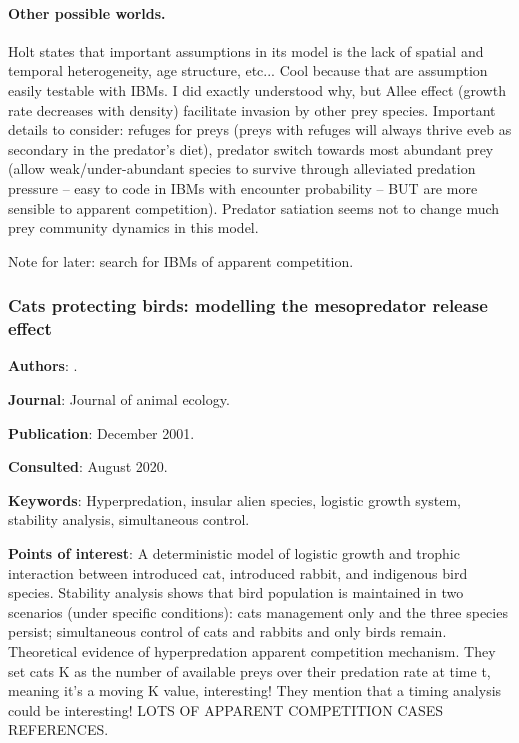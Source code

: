 \documentclass[12pt,a4paper]{article}
\begin{document}
\paragraph{Other possible worlds.} Holt states that important assumptions in its model is the lack of spatial and temporal heterogeneity, age structure, etc... Cool because that are assumption easily testable with IBMs. I did exactly understood why, but Allee effect (growth rate decreases with density) facilitate invasion by other prey species. Important details to consider: refuges for preys (preys with refuges will always thrive eveb as secondary in the predator's diet), predator switch towards most abundant prey (allow weak/under-abundant species to survive through alleviated predation pressure -- easy to code in IBMs with encounter probability -- BUT are more sensible to apparent competition). Predator satiation seems not to change much prey community dynamics in this model.
 
Note for later: search for IBMs of apparent competition.

\newpage

\subsubsection*{Cats protecting birds: modelling the mesopredator release effect}

\textbf{Authors}: \cite{courchamp1999cats}.

\textbf{Journal}: Journal of animal ecology.

\textbf{Publication}: December 2001.

\textbf{Consulted}: August 2020.

\textbf{Keywords}: Hyperpredation, insular alien species, logistic growth system, stability analysis, simultaneous control.

\textbf{Points of interest}: A deterministic model of logistic growth and trophic interaction between introduced cat, introduced rabbit, and indigenous bird species. Stability analysis shows that bird population is maintained in two scenarios (under specific conditions): cats management only and the three species persist; simultaneous control of cats and rabbits and only birds remain. Theoretical evidence of hyperpredation apparent competition mechanism. They set cats K as the number of available preys over their predation rate at time t, meaning it's a moving K value, interesting! They mention that a timing analysis could be interesting!
LOTS OF APPARENT COMPETITION CASES REFERENCES.
\end{document}

